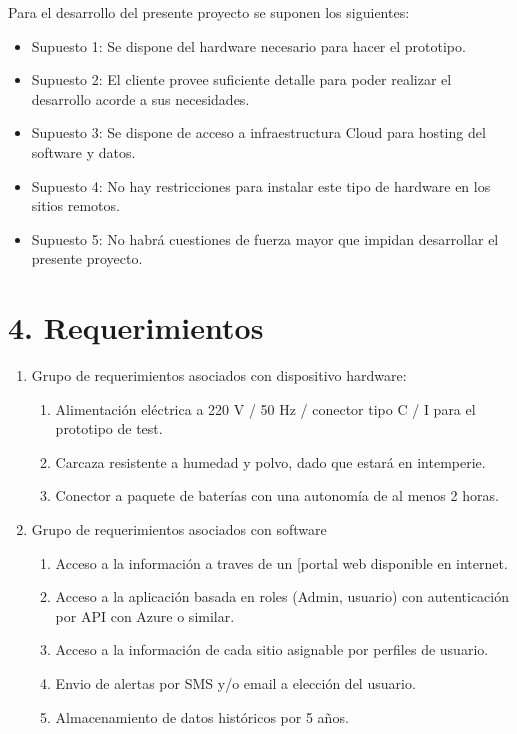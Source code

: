 \documentclass[11pt]{charter}
\begin{document}
\begin{consigna}

Para el desarrollo del presente proyecto se suponen los siguientes: 

\begin{itemize}
\item Supuesto 1: Se dispone del hardware necesario para hacer el prototipo.
\item Supuesto 2: El cliente provee suficiente detalle para poder realizar el desarrollo acorde a sus necesidades.
\item Supuesto 3: Se dispone de acceso a infraestructura Cloud para hosting del software y datos.
\item Supuesto 4: No hay restricciones para instalar este tipo de hardware en los sitios remotos.
\item Supuesto 5: No habrá cuestiones de fuerza mayor que impidan desarrollar el presente proyecto.
\end{itemize}

\end{consigna}

\section{4. Requerimientos}
\label{sec:requerimientos}

\begin{consigna}

\begin{enumerate}
\item Grupo de requerimientos asociados con dispositivo hardware:
	\begin{enumerate}
	\item Alimentación eléctrica a 220 V / 50 Hz / conector tipo C / I para el prototipo de test.	
	\item Carcaza resistente a humedad y polvo, dado que estará en intemperie.
	\item Conector a paquete de baterías con una autonomía de al menos 2 horas.
	\end{enumerate}
\item Grupo de requerimientos asociados con software
	\begin{enumerate}
	\item Acceso a la información a traves de un [portal web disponible en internet.
	\item Acceso a la aplicación basada en roles (Admin, usuario) con autenticación por API con Azure o similar. 
	\item Acceso a la información de cada sitio asignable por perfiles de usuario.
	\item Envio de alertas por SMS y/o email a elección del usuario.
	\item Almacenamiento de datos históricos por 5 años.
	\end{enumerate}
\end{enumerate}

\end{consigna}
\end{document}
